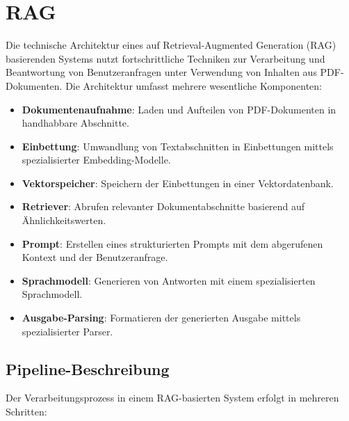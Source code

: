 \section{RAG}
\label{sec:rag}

Die technische Architektur eines auf Retrieval-Augmented Generation (RAG) basierenden Systems nutzt fortschrittliche Techniken zur Verarbeitung und Beantwortung von Benutzeranfragen unter Verwendung von Inhalten aus PDF-Dokumenten. Die Architektur umfasst mehrere wesentliche Komponenten:

\begin{itemize}
    \item \textbf{Dokumentenaufnahme}: Laden und Aufteilen von PDF-Dokumenten in handhabbare Abschnitte.
    \item \textbf{Einbettung}: Umwandlung von Textabschnitten in Einbettungen mittels spezialisierter Embedding-Modelle.
    \item \textbf{Vektorspeicher}: Speichern der Einbettungen in einer Vektordatenbank.
    \item \textbf{Retriever}: Abrufen relevanter Dokumentabschnitte basierend auf Ähnlichkeitswerten.
    \item \textbf{Prompt}: Erstellen eines strukturierten Prompts mit dem abgerufenen Kontext und der Benutzeranfrage.
    \item \textbf{Sprachmodell}: Generieren von Antworten mit einem spezialisierten Sprachmodell.
    \item \textbf{Ausgabe-Parsing}: Formatieren der generierten Ausgabe mittels spezialisierter Parser.
\end{itemize}

\subsection{Pipeline-Beschreibung}
\label{subsec:pipeline-beschreibung}
Der Verarbeitungsprozess in einem RAG-basierten System erfolgt in mehreren Schritten:

